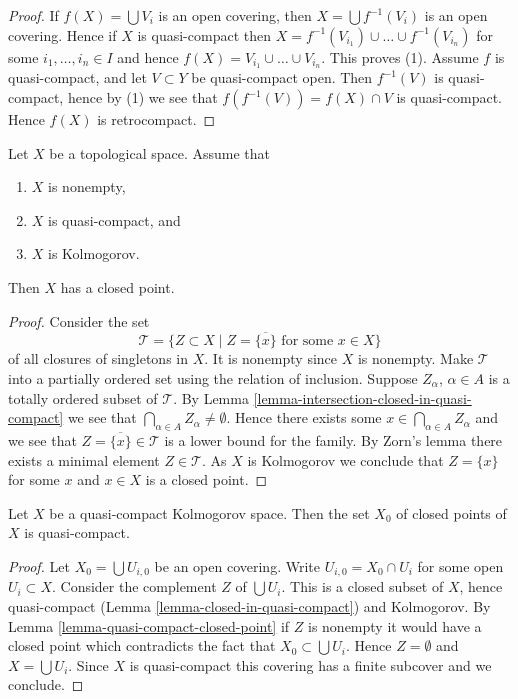 \begin{proof}
If $f(X) = \bigcup V_i$ is an open covering, then $X = \bigcup f^{-1}(V_i)$
is an open covering. Hence if $X$ is quasi-compact then
$X = f^{-1}(V_{i_1}) \cup \ldots \cup f^{-1}(V_{i_n})$ for some
$i_1, \ldots, i_n \in I$ and hence
$f(X) = V_{i_1} \cup \ldots \cup V_{i_n}$. This proves (1).
Assume $f$ is quasi-compact, and let $V \subset Y$ be quasi-compact open.
Then $f^{-1}(V)$ is quasi-compact, hence by (1) we see that
$f(f^{-1}(V)) = f(X) \cap V$ is quasi-compact. Hence $f(X)$
is retrocompact.
\end{proof}

\begin{lemma}
\label{lemma-quasi-compact-closed-point}
Let $X$ be a topological space. Assume that
\begin{enumerate}
\item $X$ is nonempty,
\item $X$ is quasi-compact, and
\item $X$ is Kolmogorov.
\end{enumerate}
Then $X$ has a closed point.
\end{lemma}

\begin{proof}
Consider the set
$$
\mathcal{T} =
\{Z \subset X \mid Z = \overline{\{x\}} \text{ for some }x \in X\}
$$
of all closures of singletons in $X$. It is nonempty since $X$ is
nonempty. Make $\mathcal{T}$ into a
partially ordered set using the relation of inclusion.
Suppose $Z_\alpha$, $\alpha \in A$ is a totally ordered subset of $\mathcal{T}$.
By Lemma \ref{lemma-intersection-closed-in-quasi-compact} we see
that $\bigcap_{\alpha \in A} Z_\alpha \not = \emptyset$. Hence there exists
some $x \in \bigcap_{\alpha \in A} Z_\alpha$ and we see that
$Z = \overline{\{x\}}\in \mathcal{T}$ is a lower bound for
the family. By Zorn's lemma there exists a minimal element
$Z \in \mathcal{T}$. As $X$ is Kolmogorov we conclude that
$Z = \{x\}$ for some $x$ and $x \in X$ is a closed point.
\end{proof}

\begin{lemma}
\label{lemma-closed-points-quasi-compact}
Let $X$ be a quasi-compact Kolmogorov space. Then the set $X_0$ of
closed points of $X$ is quasi-compact.
\end{lemma}

\begin{proof}
Let $X_0 = \bigcup U_{i, 0}$ be an open covering.
Write $U_{i, 0} = X_0 \cap U_i$ for some open $U_i \subset X$.
Consider the complement $Z$ of $\bigcup U_i$. This is a closed subset of
$X$, hence quasi-compact (Lemma \ref{lemma-closed-in-quasi-compact})
and Kolmogorov. By Lemma \ref{lemma-quasi-compact-closed-point}
if $Z$ is nonempty it would have a closed
point which contradicts the fact that $X_0 \subset \bigcup U_i$.
Hence $Z = \emptyset$ and $X = \bigcup U_i$. Since $X$ is quasi-compact
this covering has a finite subcover and we conclude.
\end{proof}

